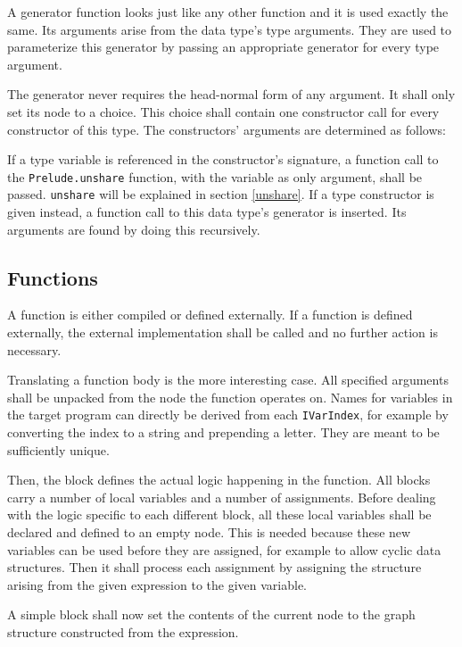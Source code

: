 A generator function looks just like any other function and it is used exactly the same.
Its arguments arise from the data type's type arguments.
They are used to parameterize this generator by passing an appropriate generator for every type argument.

The generator never requires the head-normal form of any argument.
It shall only set its node to a choice.
This choice shall contain one constructor call for every constructor of this type.
The constructors' arguments are determined as follows:

If a type variable is referenced in the constructor's signature, a function call to the \texttt{Prelude.unshare} function, with the variable as only argument, shall be passed.
\texttt{unshare} will be explained in section \ref{unshare}.
If a type constructor is given instead, a function call to this data type's generator is inserted.
Its arguments are found by doing this recursively.


\subsection{Functions}

A function is either compiled or defined externally.
If a function is defined externally, the external implementation shall be called and no further action is necessary.

Translating a function body is the more interesting case.
All specified arguments shall be unpacked from the node the function operates on.
Names for variables in the target program can directly be derived from each \texttt{IVarIndex}, for example by converting the index to a string and prepending a letter.
They are meant to be sufficiently unique.

Then, the block defines the actual logic happening in the function.
All blocks carry a number of local variables and a number of assignments.
Before dealing with the logic specific to each different block, all these local variables shall be declared and defined to an empty node.
This is needed because these new variables can be used before they are assigned, for example to allow cyclic data structures.
Then it shall process each assignment by assigning the structure arising from the given expression to the given variable.

A simple block shall now set the contents of the current node to the graph structure constructed from the expression.

